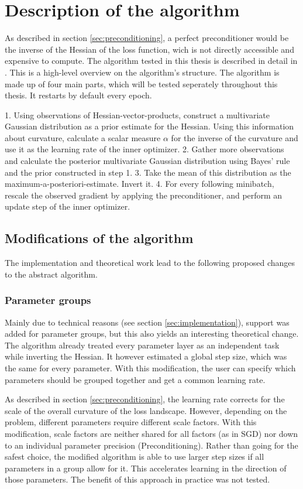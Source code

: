 \documentclass[twoside,12pt,a4paper]{report}
\begin{document}
\section{Description of the algorithm}
As described in section \ref{sec:preconditioning}, a perfect preconditioner would be the inverse of the Hessian of the loss function, wich is not directly accessible and expensive to compute.
The algorithm tested in this thesis is described in detail in \cite{roos2019active}.
This is a high-level overview on the algorithm's structure.
The algorithm is made up of four main parts, which will be tested seperately throughout this thesis.
It restarts by default every epoch.
\begin{markdown}
1. Using observations of Hessian-vector-products, construct a multivariate Gaussian distribution as a prior estimate for the Hessian. Using this information about curvature, calculate a scalar measure $\alpha$ for the inverse of the curvature and use it as the learning rate of the inner optimizer.
2. Gather more observations and calculate the posterior multivariate Gaussian distribution using Bayes' rule and the prior constructed in step 1.
3. Take the mean of this distribution as the maximum-a-posteriori-estimate. Invert it.
4. For every following minibatch, rescale the observed gradient by applying the preconditioner, and perform an update step of the inner optimizer.
\end{markdown}


\subsection{Modifications of the algorithm}
The implementation and theoretical work lead to the following proposed changes to the abstract algorithm.

\subsubsection{Parameter groups}
Mainly due to technical reasons (see section \ref{sec:implementation}), support was added for parameter groups, but this also yields an interesting theoretical change. The algorithm already treated every parameter layer as an independent task while inverting the Hessian. It however estimated a global step size, which was the same for every parameter. With this modification, the user can specify which parameters should be grouped together and get a common learning rate.

As described in section \ref{sec:preconditioning}, the learning rate corrects for the scale of the overall curvature of the loss landscape. However, depending on the problem, different parameters require different scale factors. With this modification, scale factors are neither shared for all factors (as in SGD) nor down to an individual parameter precision (Preconditioning).
Rather than going for the safest choice, the modified algorithm is able to use larger step sizes if all parameters in a group allow for it. This accelerates learning in the direction of those parameters. The benefit of this approach in practice was not tested.
\end{document}
